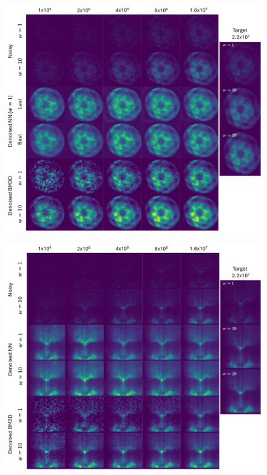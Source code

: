 \begin{figure}[h]
    \centering
    \includegraphics[width=1\linewidth]{images/nn_denoised_counts_best_last_xy_bm3d.pdf}
    \caption{}
    \label{fig:nn-denoised-counts-best-last-xy-bm3d}
\end{figure}


\begin{figure}[h]
    \centering
    \includegraphics[width=1\linewidth]{images/nn_denoised_counts_best_last_ex_bm3d_slice_sum_last_model.pdf}
    \caption{}
    \label{fig:nn-denoised-counts-best-last-xy-bm3d-slice-sum-last-model}
\end{figure}


